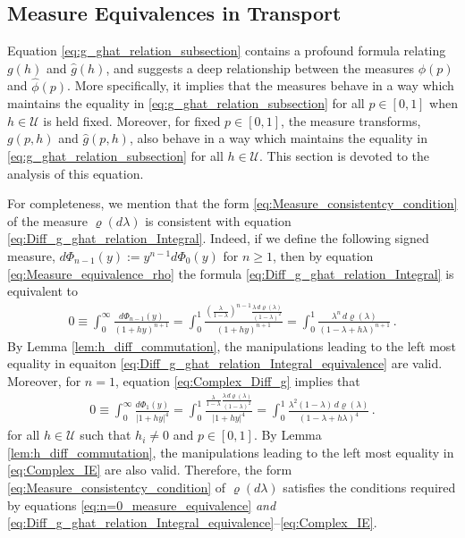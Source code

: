\documentclass[english,12pt,jmp,graphicx]{revtex4-1}
\newcommand{\ph}{\hat{\phi}}
\begin{document}
\subsection{Measure Equivalences in Transport} \label{sec:Measure_Equiv}
%

Equation \eqref{eq:g_ghat_relation_subsection} contains a profound
formula relating $g(h)$ and $\hat{g}(h)$, and suggests a deep relationship
between the measures $\phi(p)$ and $\ph(p)$. More specifically, it
implies that the measures behave in a way which maintains the equality
in \eqref{eq:g_ghat_relation_subsection} for all $p\in[0,1]$ when $h\in\mathcal{U}$
is held fixed. Moreover, for fixed $p\in[0,1]$, the measure transforms,
$g(p,h)$ and $\hat{g}(p,h)$, also behave in a way which maintains the
equality in \eqref{eq:g_ghat_relation_subsection} for all $h\in\mathcal{U}$. This
section is devoted to the analysis of this equation.

For completeness, we mention that the form
\eqref{eq:Measure_consistentcy_condition} of the measure $\varrho(d\lambda)$ is 
consistent with equation
\eqref{eq:Diff_g_ghat_relation_Integral}. Indeed, if we define the
following signed measure,
$d\Phi_{n-1}(y):=y^{n-1}d\Phi_0(y)$ for $n\geq1$, then by equation
\eqref{eq:Measure_equivalence_rho} the formula
\eqref{eq:Diff_g_ghat_relation_Integral} is equivalent to         
%
\begin{align}\label{eq:Diff_g_ghat_relation_Integral_equivalence}  
   0\equiv\int_0^\infty\frac{d\Phi_{n-1}(y)}{(1+hy)^{n+1}}
    =\int_0^1\frac{\left(\frac{\lambda}{1-\lambda}\right)^{n-1}\frac{\lambda\,d\varrho(\lambda)}{(1-\lambda)^2}}
             {(1+hy)^{n+1}}
    =\int_0^1\frac{\lambda^n\,d\varrho(\lambda)}{(1-\lambda+h\lambda)^{n+1}}\,.
\end{align}
%
By Lemma \ref{lem:h_diff_commutation}, the manipulations leading to
the left most equality in equaiton
\eqref{eq:Diff_g_ghat_relation_Integral_equivalence} are 
valid.  Moreover, for $n=1$, equation \eqref{eq:Complex_Diff_g}
implies that
%
\begin{align}\label{eq:Complex_IE} 
  0\equiv\int_0^\infty\frac{d\Phi_1(y)}{|1+hy|^4}=\int_0^1\frac{\frac{\lambda}{1-\lambda}\frac{\lambda\,d\varrho(\lambda)}{(1-\lambda)^2}}
             {|1+hy|^4}
    =\int_0^1\frac{\lambda^2(1-\lambda)\,d\varrho(\lambda)}{(1-\lambda+h\lambda)^4}\,.
\end{align}
%
for all $h\in\mathcal{U}$ such that $h_i\neq0$ and $p\in[0,1]$. By Lemma
\ref{lem:h_diff_commutation}, the manipulations leading to 
the left most equality in \eqref{eq:Complex_IE} are also
valid. Therefore, the form \eqref{eq:Measure_consistentcy_condition} of
$\varrho(d\lambda)$ satisfies the conditions required by equations
\eqref{eq:n=0_measure_equivalence} \emph{and} 
\eqref{eq:Diff_g_ghat_relation_Integral_equivalence}--\eqref{eq:Complex_IE}.
\end{document}
